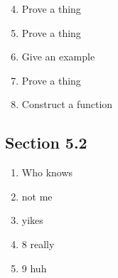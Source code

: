 \documentclass[11pt]{article}
\begin{document}
\begin{enumerate}
\setcounter{enumi}{3}

\item{Prove a thing}

\item{Prove a thing}

\item{Give an example}

\item{Prove a thing}

\item{Construct a function}

\end{enumerate}

\subsection*{Section 5.2}

\begin{enumerate}
\item{Who knows}

\item{not me}

\item{yikes}

\setcounter{enumi}{7}
\item{8 really}

\item{9 huh}

\end{enumerate}
\end{document}
